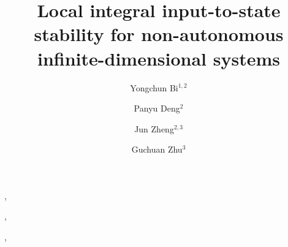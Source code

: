 \documentclass[onecolumn]{autart}
\newenvironment{proof of Prop.ODE}{{\it Proof of Proposition~\ref{Prop.ODE}:\enspace}}{\hfill $\blacksquare$\par}
\newenvironment{proof of PDE}{{\it Proof of Proposition \ref{Prop.8}:\enspace}}{\hfill $\blacksquare$\par}
\begin{document}
%
\begin{frontmatter}

\title{Local integral input-to-state stability for non-autonomous infinite-dimensional systems} %

\author{Yongchun Bi$^{1,2}$},
\author{Panyu Deng$^{2}$},
\author{Jun Zheng$^{2,3}$},
\author{Guchuan Zhu$^{3}$}

\address{$^{1}${State Key Laboratory of Rail Transit Vehicle System}, Southwest Jiaotong University, Chengdu, China\\
	$^{2}${School of Mathematics}, Southwest Jiaotong University, Chengdu, China\\
                $^{3}$Department of Electrical Engineering, Polytechnique
                Montr\'{e}al,
                Montreal,  Canada}  %



\end{frontmatter}
\end{document}
